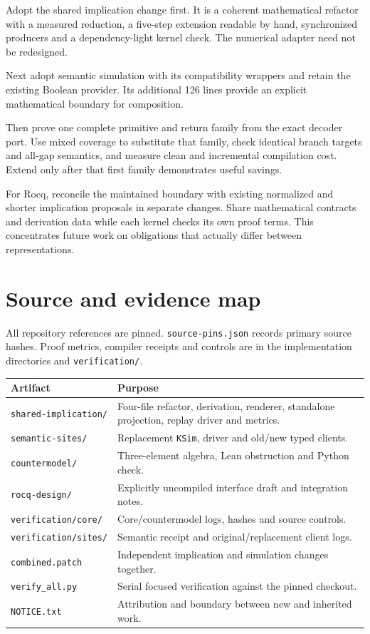 \documentclass[11pt,letterpaper]{article}
\newcommand{\code}[1]{\texttt{#1}}
\begin{document}
Adopt the shared implication change first. It is a coherent mathematical
refactor with a measured reduction, a five-step extension readable by hand,
synchronized producers and a dependency-light kernel check. The numerical
adapter need not be redesigned.

Next adopt semantic simulation with its compatibility wrappers and retain the
existing Boolean provider. Its additional 126 lines provide an explicit
mathematical boundary for composition.

Then prove one complete primitive and return family from the exact decoder
port. Use mixed coverage to substitute that family, check identical branch
targets and all-gap semantics, and measure clean and incremental compilation
cost. Extend only after that first family demonstrates useful savings.

For Rocq, reconcile the maintained boundary with existing normalized and shorter
implication proposals in separate changes. Share mathematical contracts and
derivation data while each kernel checks its own proof terms. This concentrates
future work on obligations that actually differ between representations.

\appendix
\section{Source and evidence map}
All repository references are pinned. \code{source-pins.json} records primary
source hashes. Proof metrics, compiler receipts and controls are in the
implementation directories and \code{verification/}.

\begin{longtable}{p{}p{}}
\toprule
Artifact & Purpose\\ \midrule\endhead
\code{shared-implication/} & Four-file refactor, derivation, renderer, standalone
projection, replay driver and metrics.\\
\code{semantic-sites/} & Replacement \code{KSim}, driver and old/new typed clients.\\
\code{countermodel/} & Three-element algebra, Lean obstruction and Python check.\\
\code{rocq-design/} & Explicitly uncompiled interface draft and integration notes.\\
\code{verification/core/} & Core/countermodel logs, hashes and source controls.\\
\code{verification/sites/} & Semantic receipt and original/replacement client logs.\\
\code{combined.patch} & Independent implication and simulation changes together.\\
\code{verify\_all.py} & Serial focused verification against the pinned checkout.\\
\code{NOTICE.txt} & Attribution and boundary between new and inherited work.\\
\bottomrule
\end{longtable}
\end{document}

